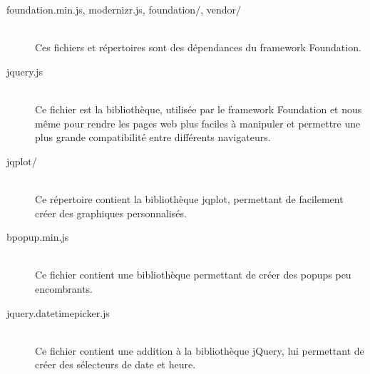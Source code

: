 \begin{description}
            \item[foundation.min.js, modernizr.js, foundation/, vendor/]\hfill \\
                Ces fichiers et répertoires sont des dépendances du framework
                Foundation.
            \item[jquery.js]\hfill \\
                Ce fichier est la bibliothèque, utilisée par le framework
                Foundation et nous même pour rendre les pages web plus faciles
                à manipuler et permettre une plus grande compatibilité entre
                différents navigateurs.
            \item[jqplot/]\hfill \\
                Ce répertoire contient la bibliothèque jqplot, permettant
                de facilement créer des graphiques personnalisés.
            \item[bpopup.min.js]\hfill \\
                Ce fichier contient une bibliothèque permettant de créer des
                popups peu encombrants.
            \item[jquery.datetimepicker.js]\hfill \\
                Ce fichier contient une addition à la bibliothèque jQuery, lui
                permettant de créer des sélecteurs de date et heure.
        \end{description}


